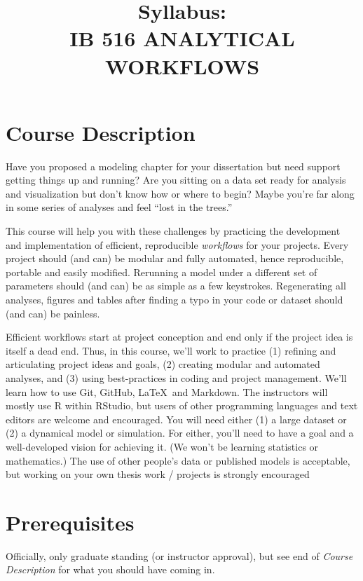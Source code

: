 \documentclass[10pt]{article}
\title{Syllabus:\\IB 516 ANALYTICAL WORKFLOWS}
\author{}
\date{}
\begin{document}
\maketitle
\vspace{-50pt}


\section*{Course Description}
	Have you proposed a modeling chapter for your dissertation but need 
	support getting things up and
	running?
	Are you sitting on a data set ready for analysis and visualization but don't 
	know how or
	where to begin?
	Maybe you're far along in some series of analyses and feel ``lost in the 
	trees.''

	This course will help you with these challenges by practicing the 
	development and implementation of
	efficient, reproducible \emph{workflows} for your projects.
	Every project should (and can) be modular and fully automated, hence 
	reproducible, portable and
	easily modified.
	Rerunning a model under a different set of parameters should (and can) be 
	as simple as a few
	keystrokes.
	Regenerating all analyses, figures and tables after finding a typo in your 
	code or dataset should (and
	can) be painless.

	Efficient workflows start at project conception and end only if the project idea 
	is itself a dead end.
	Thus, in this course, we'll work to practice
	(1) refining and articulating project ideas and goals,
	(2) creating modular and automated analyses, and
	(3) using best-practices in coding and project management.
	We'll learn how to use Git, GitHub, \LaTeX\, and Markdown.
	The instructors will mostly use \textsf{R} within RStudio, but users of other 
	programming languages
	and text editors are welcome and encouraged.
	You will need either
	(1) a large dataset
	or
	(2) a dynamical model or simulation.
	For either, you'll need to have a goal and a well-developed vision for 
	achieving it.
	(We won't be learning statistics or mathematics.)
	The use of other people's data or published models is acceptable, but 
	working on your own thesis work / projects is strongly encouraged

\section*{Prerequisites}
\noindent
	Officially, only graduate standing (or instructor approval), but see end of 
	\emph{Course Description} for what you should have coming in.
\end{document}
